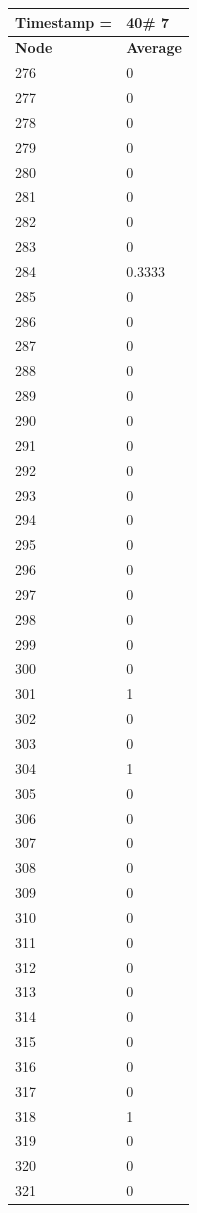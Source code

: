 \begin{tabular}{|l||l|}
\hline
\textbf{Timestamp =} & \textbf{40}\# 7\\\hline
	\textbf{Node} & \textbf{Average} \\ \hline
\hline
	276 & 0 \\ \hline
	277 & 0 \\ \hline
	278 & 0 \\ \hline
	279 & 0 \\ \hline
	280 & 0 \\ \hline
	281 & 0 \\ \hline
	282 & 0 \\ \hline
	283 & 0 \\ \hline
	284 & 0.3333 \\ \hline
	285 & 0 \\ \hline
	286 & 0 \\ \hline
	287 & 0 \\ \hline
	288 & 0 \\ \hline
	289 & 0 \\ \hline
	290 & 0 \\ \hline
	291 & 0 \\ \hline
	292 & 0 \\ \hline
	293 & 0 \\ \hline
	294 & 0 \\ \hline
	295 & 0 \\ \hline
	296 & 0 \\ \hline
	297 & 0 \\ \hline
	298 & 0 \\ \hline
	299 & 0 \\ \hline
	300 & 0 \\ \hline
	301 & 1 \\ \hline
	302 & 0 \\ \hline
	303 & 0 \\ \hline
	304 & 1 \\ \hline
	305 & 0 \\ \hline
	306 & 0 \\ \hline
	307 & 0 \\ \hline
	308 & 0 \\ \hline
	309 & 0 \\ \hline
	310 & 0 \\ \hline
	311 & 0 \\ \hline
	312 & 0 \\ \hline
	313 & 0 \\ \hline
	314 & 0 \\ \hline
	315 & 0 \\ \hline
	316 & 0 \\ \hline
	317 & 0 \\ \hline
	318 & 1 \\ \hline
	319 & 0 \\ \hline
	320 & 0 \\ \hline
	321 & 0 \\ \hline
\end{tabular}
